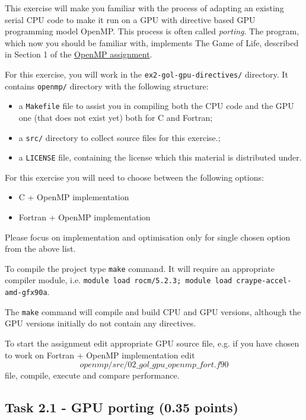 \documentclass[a4paper, 11pt]{article}
\begin{document}
        This exercise will make you familiar with the process of adapting an existing serial CPU code to make it run on a GPU with directive based GPU programming model OpenMP. This process is often called \textit{porting}. The program, which now you should be familiar with, implements The Game of Life, described in Section 1 of the \href{https://pawsey.atlassian.net/wiki/download/attachments/51923133/HPC_Course_OpenMP_Assignment.pdf?api=v2}{OpenMP assignment}.

        For this exercise, you will work in the \texttt{ex2-gol-gpu-directives/} directory. It contains \texttt{openmp/} directory with the following structure:
        \begin{itemize}
                \item a \texttt{Makefile} file to assist you in compiling both the CPU code and the GPU one (that does not exist yet) both for C and Fortran;
                \item a \texttt{src/} directory to collect source files for this exercise.;
                \item a \texttt{LICENSE} file, containing the license which this material is distributed under.
        \end{itemize}

	For this exercise you will need to choose between the following options:
	\begin{itemize}
		\item C + OpenMP implementation
		\item Fortran + OpenMP implementation
	\end{itemize}
	Please focus on implementation and optimisation only for single chosen option from the above list.

	To compile the project type \texttt{make} command. It will require an appropriate compiler module, i.e. \texttt{module load rocm/5.2.3; module load craype-accel-amd-gfx90a}.
	
	The \texttt{make} command will compile and build CPU and GPU versions, although the GPU versions initially do not contain any directives. 

	To start the assignment edit appropriate GPU source file, e.g. if you have chosen to work on Fortran + OpenMP implementation edit \[openmp/src/02\_gol\_gpu\_openmp\_fort.f90\] file, compile, execute and compare performance. 

        \subsection{Task 2.1 - GPU porting (0.35 points)}
\end{document}
